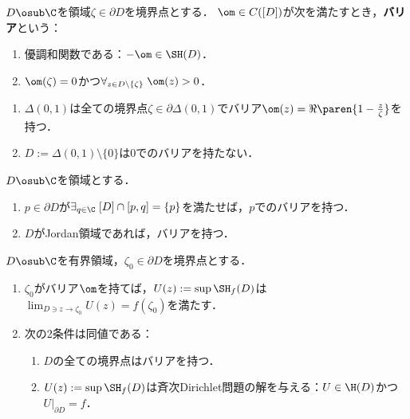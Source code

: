 \documentclass[uplatex,dvipdfmx]{jsreport}
\begin{document}
\begin{definition}[barrier]
    $D\osub\C$を領域$\zeta\in\partial D$を境界点とする．
    $\om\in C([D])$が次を満たすとき，\textbf{バリア}という：
    \begin{enumerate}
        \item 優調和関数である：$-\om\in\SH(D)$．
        \item $\om(\zeta)=0$かつ$\forall_{z\in D\setminus\{\zeta\}}\;\om(z)>0$．
    \end{enumerate}
\end{definition}

\begin{example}\mbox{}
    \begin{enumerate}
        \item $\Delta(0,1)$は全ての境界点$\zeta\in\partial\Delta(0,1)$でバリア$\om(z)=\Re\paren{1-\frac{z}{\zeta}}$を持つ．
        \item $D:=\Delta(0,1)\setminus\{0\}$は$0$でのバリアを持たない．
    \end{enumerate}
\end{example}

\begin{proposition}
    $D\osub\C$を領域とする．
    \begin{enumerate}
        \item $p\in\partial D$が$\exists_{q\in\C}\;[D]\cap[p,q]=\{p\}$を満たせば，$p$でのバリアを持つ．
        \item $D$がJordan領域であれば，バリアを持つ．
    \end{enumerate}
\end{proposition}

\begin{theorem}
    $D\osub\C$を有界領域，$\zeta_0\in\partial D$を境界点とする．
    \begin{enumerate}
        \item $\zeta_0$がバリア$\om$を持てば，$U(z):=\sup\SH_f(D)$は$\lim_{D\ni z\to\zeta_0}U(z)=f(\zeta_0)$を満たす．
        \item 次の2条件は同値である：
        \begin{enumerate}
            \item $D$の全ての境界点はバリアを持つ．
            \item $U(z):=\sup\SH_f(D)$は斉次Dirichlet問題の解を与える：$U\in\H(D)$かつ$U|_{\partial D}=f$．
        \end{enumerate}
    \end{enumerate}
\end{theorem}
\end{document}
